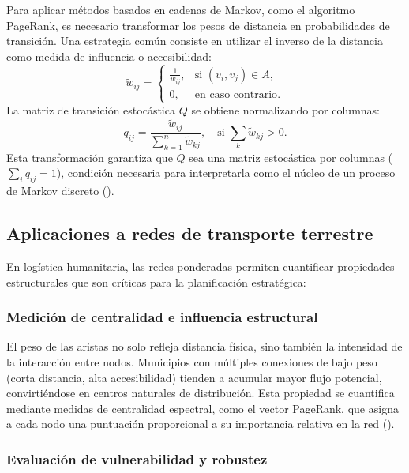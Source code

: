 \documentclass[
  spanish,
  us-letterpaper,
]{scrreprt}
\numberwithin{equation}{section}
\begin{document}
Para aplicar métodos basados en cadenas de Markov, como el algoritmo
PageRank, es necesario transformar los pesos de distancia en
probabilidades de transición. Una estrategia común consiste en utilizar
el inverso de la distancia como medida de influencia o accesibilidad: \[
\tilde{w}_{ij} = 
\begin{cases}
\displaystyle \frac{1}{w_{ij}}, & \text{si } (v_i, v_j) \in A, \\
0, & \text{en caso contrario}.
\end{cases}
\] La matriz de transición estocástica \(Q\) se obtiene normalizando por
columnas: \[
q_{ij} = \frac{\tilde{w}_{ij}}{\sum_{k=1}^n \tilde{w}_{kj}}, \quad \text{si } \sum_{k} \tilde{w}_{kj} > 0.
\] Esta transformación garantiza que \(Q\) sea una matriz estocástica
por columnas (\(\sum_i q_{ij} = 1\)), condición necesaria para
interpretarla como el núcleo de un proceso de Markov discreto
().

\subsection{Aplicaciones a redes de transporte
terrestre}\label{aplicaciones-a-redes-de-transporte-terrestre}

En logística humanitaria, las redes ponderadas permiten cuantificar
propiedades estructurales que son críticas para la planificación
estratégica:

\subsubsection{Medición de centralidad e influencia
estructural}\label{mediciuxf3n-de-centralidad-e-influencia-estructural}

El peso de las aristas no solo refleja distancia física, sino también la
intensidad de la interacción entre nodos. Municipios con múltiples
conexiones de bajo peso (corta distancia, alta accesibilidad) tienden a
acumular mayor flujo potencial, convirtiéndose en centros naturales de
distribución. Esta propiedad se cuantifica mediante medidas de
centralidad espectral, como el vector PageRank, que asigna a cada nodo
una puntuación proporcional a su importancia relativa en la red
().

\subsubsection{Evaluación de vulnerabilidad y
robustez}\label{evaluaciuxf3n-de-vulnerabilidad-y-robustez}
\end{document}
